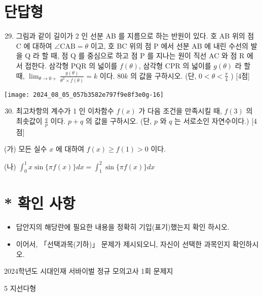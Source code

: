 \documentclass[10pt]{article}
\begin{document}
\section*{단답형}
\begin{enumerate}
  \setcounter{enumi}{28}
  \item 그림과 같이 길이가 2 인 선분 AB 를 지름으로 하는 반원이 있다. 호 AB 위의 점 C 에 대하여 \(\angle \mathrm{CAB}=\theta\) 이고, 호 BC 위의 점 P 에서 선분 AB 에 내린 수선의 발을 Q 라 할 때, 점 Q 를 중심으로 하고 점 P 를 지나는 원이 직선 AC 와 점 R 에서 접한다. 삼각형 PQR 의 넓이를 \(f(\theta)\), 삼각형 CPR 의 넓이를 \(g(\theta)\) 라 할 때, \(\lim _{\theta \rightarrow 0+} \frac{g(\theta)}{\theta^{2} \times f(\theta)}=k\) 이다. \(80 k\) 의 값을 구하시오. (단, \(0<\theta<\frac{\pi}{4}\) ) [4점]
\end{enumerate}

\begin{center}
\texttt{[image: 2024\_08\_05\_057b3582e797f9e8f3e0g-16]}
\end{center}

\begin{enumerate}
  \setcounter{enumi}{29}
  \item 최고차항의 계수가 1 인 이차함수 \(f(x)\) 가 다음 조건을 만족시킬 때, \(f(3)\) 의 최솟값이 \(\frac{q}{p}\) 이다. \(p+q\) 의 값을 구하시오. (단, \(p\) 와 \(q\) 는 서로소인 자연수이다.) [4점]
\end{enumerate}

(가) 모든 실수 \(x\) 에 대하여 \(f(x) \geq f(1)>0\) 이다.

(나) \(\int_{0}^{1} x \sin \{\pi f(x)\} d x=\int_{1}^{2} \sin \{\pi f(x)\} d x\)

\section*{* 확인 사항}
\begin{itemize}
  \item 답안지의 해당란에 필요한 내용을 정확히 기입(표기)했는지 확인 하시오.

  \item 이어서, 「선택과목(기하)」 문제가 제시되오니, 자신이 선택한 과목인지 확인하시오.

\end{itemize}

2024학년도 시대인재 서바이벌 정규 모의고사 1회 문제지

5 지선다형
\end{document}
